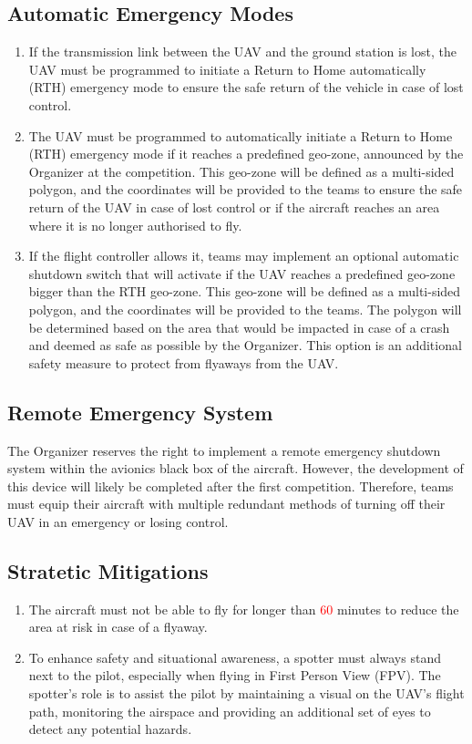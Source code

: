\documentclass{article}
\begin{document}
\subsection{Automatic Emergency Modes}
\begin{enumerate}
  \item If the transmission link between the UAV and the ground station is lost, the UAV must be programmed to initiate a Return to Home automatically (RTH) emergency mode to ensure the safe return of the vehicle in case of lost control.
  \item The UAV must be programmed to automatically initiate a Return to Home (RTH) emergency mode if it reaches a predefined geo-zone, announced by the Organizer at the competition. This geo-zone will be defined as a multi-sided polygon, and the coordinates will be provided to the teams to ensure the safe return of the UAV in case of lost control or if the aircraft reaches an area where it is no longer authorised to fly.
  \item If the flight controller allows it, teams may implement an optional automatic shutdown switch that will activate if the UAV reaches a predefined geo-zone bigger than the RTH geo-zone. This geo-zone will be defined as a multi-sided polygon, and the coordinates will be provided to the teams. The polygon will be determined based on the area that would be impacted in case of a crash and deemed as safe as possible by the Organizer. This option is an additional safety measure to protect from flyaways from the UAV.
\end{enumerate}


\subsection{Remote Emergency System}
The Organizer reserves the right to implement a remote emergency shutdown system within the avionics black box of the aircraft. However, the development of this device will likely be completed after the first competition. Therefore, teams must equip their aircraft with multiple redundant methods of turning off their UAV in an emergency or losing control.

\subsection{Stratetic Mitigations}
\begin{enumerate}
  \item The aircraft must not be able to fly for longer than \textcolor{red}{60} minutes to reduce the area at risk in case of a flyaway.
  \item To enhance safety and situational awareness, a spotter must always stand next to the pilot, especially when flying in First Person View (FPV). The spotter's role is to assist the pilot by maintaining a visual on the UAV's flight path, monitoring the airspace and providing an additional set of eyes to detect any potential hazards. 
\end{enumerate}
\end{document}
